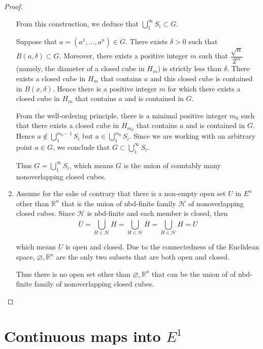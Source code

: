 \begin{proof}
\begin{enumerate}[label={(\alph*)}]
              From this construction, we deduce that \( \bigcup^{\infty}_{1} S_{i} \subset G \).

              Suppose that \( a = (a^{1}, \ldots, a^{n}) \in G \). There exists \( \delta > 0 \) such that \( B(a, \delta) \subset G \). Moreover, there exists a positive integer \(m\) such that \( \dfrac{\sqrt{n}}{2^{m}} \) (namely, the diameter of a closed cube in \(H_{m}\)) is strictly less than \( \delta \). There exists a closed cube in \(H_{m}\) that contains \( a \) and this closed cube is contained in \( B(x, \delta) \). Hence there is a positive integer \( m \) for which there exists a closed cube in \( H_{m} \) that contains \( a \) and is contained in \( G \).

              From the well-ordering principle, there is a minimal positive integer \( m_{0} \) such that there exists a closed cube in \( H_{m_{0}} \) that contains \( a \) and is contained in \( G \). Hence \( a \notin \bigcup^{m_{0} - 1}_{1} S_{i} \) but \( a \in \bigcup^{m_{0}}_{1} S_{i} \). Since we are working with an arbitrary point \( a \in G \), we conclude that \( G \subset \bigcup^{\infty}_{1} S_{i} \).

              Thus \( G = \bigcup^{\infty}_{1} S_{i} \), which means \( G \) is the union of countably many nonoverlapping closed cubes.
        \item Assume for the sake of contrary that there is a non-empty open set \( U \) in \( E^{n} \) other than \( \mathbb{R}^{n} \) that is the union of nbd-finite family \( \mathscr{H} \) of nonoverlapping closed cubes. Since \( \mathscr{H} \) is nbd-finite and each member is closed, then
              \[
                  \overline{U} = \overline{\bigcup_{H \in \mathscr{H}} H} = \bigcup_{H \in \mathscr{H}} \overline{H} = \bigcup_{H \in \mathscr{H}} H = U
              \]

              which means \( U \) is open and closed. Due to the connectedness of the Euclidean space, \( \varnothing, \mathbb{R}^{n} \) are the only two subsets that are both open and closed.

              Thus there is no open set other than \( \varnothing, \mathbb{R}^{n} \) that can be the union of of nbd-finite family of nonoverlapping closed cubes.
    \end{enumerate}
\end{proof}

\section{Continuous maps into \( E^{1} \)}

